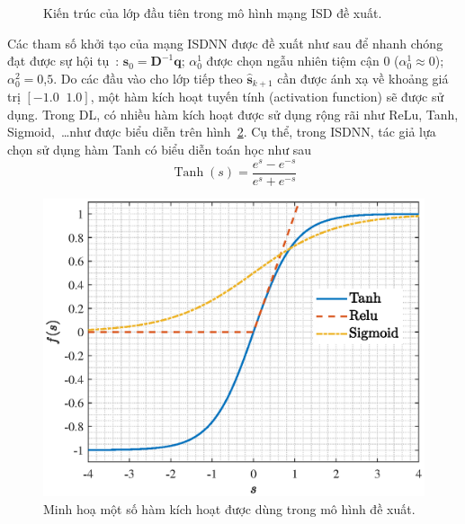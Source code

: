 \begin{figure}[ht]
    \caption{Kiến trúc của lớp đầu tiên trong mô hình mạng ISD đề xuất.}
    \label{fig:ISD}
\end{figure}

Các tham số khởi tạo của mạng ISDNN được đề xuất như sau để nhanh chóng đạt được sự hội tụ~\cite{Narasimhan2014}: $\mathbf{s}_0 = \mathbf{D}^{-1}\mathbf{q}$; $\alpha^1_0$ được chọn ngẫu nhiên tiệm cận $0$ ($\alpha^1_0 \approx 0$); $\alpha^2_0 = 0$,$5$. Do các đầu vào cho lớp tiếp theo $\hat{\mathbf{s}}_{k+1}$ cần được ánh xạ về khoảng giá trị $[-1.0 \;\; 1.0]$, một hàm kích hoạt tuyến tính (activation function) sẽ được sử dụng. Trong DL, có nhiều hàm kích hoạt được sử dụng rộng rãi như ReLu, Tanh, Sigmoid,~\ldots như được biểu diễn trên hình~\ref{fig:tanh}. Cụ thể, trong ISDNN, tác giả lựa chọn sử dụng hàm Tanh có biểu diễn toán học như sau
\begin{equation}
    \operatorname{Tanh}(s) = \frac{e^s - e^{-s}}{e^s + e^{-s}}
\end{equation}
\begin{figure}[ht]
    \centering
    \includegraphics[width=.6\linewidth]{figures/tanh.eps}
    \caption{Minh hoạ một số hàm kích hoạt được dùng trong mô hình đề xuất.}
    \label{fig:tanh}
\end{figure}

